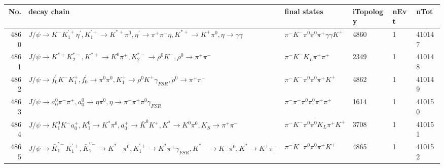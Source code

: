 \begin{table}[htbp] 
\begin{center}
\begin{small}
\begin{tabular}{rlllll}\hline\hline
 No. & decay chain & final states &  iTopology & nEvt & nTot \\\hline
4860&$J/\psi       \rightarrow K^{-}          K_1^{'+}      \eta^{\prime} , K_1^{'+}       \rightarrow K^{*+}         \pi^{0}        , \eta^{\prime}  \rightarrow \pi^{+}        \pi^{-}        \eta          , K^{*+}          \rightarrow K^{+}          \pi^{0}        , \eta           \rightarrow \gamma       \gamma       $&$\pi^{-}        K^{-}          \pi^{0}        \pi^{0}        \pi^{+}        \gamma       \gamma       K^{+}          $& 4860&    1&410147\\
4861&$J/\psi       \rightarrow K^{*+}         K_2^{*-}       , K^{*+}          \rightarrow K^{0}          \pi^{+}        , K_2^{*-}        \rightarrow \rho^{0}      K^{-}          , \rho^{0}       \rightarrow \pi^{+}        \pi^{-}        $&$\pi^{-}        K^{-}          K_{L}          \pi^{+}        \pi^{+}        $& 2349&    1&410148\\
4862&$J/\psi       \rightarrow f^{'}_{0}     K^{-}          K_1^{+}        , f^{'}_{0}      \rightarrow \pi^{0}        \pi^{0}        , K_1^{+}         \rightarrow \rho^{0}      K^{+}          \gamma_{FSR} , \rho^{0}       \rightarrow \pi^{+}        \pi^{-}        $&$\pi^{-}        K^{-}          \pi^{0}        \pi^{0}        \pi^{+}        K^{+}          $& 4862&    1&410149\\
4863&$J/\psi       \rightarrow a_{0}^{0}      \pi^{-}        \pi^{+}        , a_{0}^{0}       \rightarrow \eta          \pi^{0}        , \eta           \rightarrow \pi^{-}        \pi^{+}        \pi^{0}        \gamma_{FSR} $&$\pi^{-}        \pi^{-}        \pi^{0}        \pi^{0}        \pi^{+}        \pi^{+}        $& 1614&    1&410150\\
4864&$J/\psi       \rightarrow K_1^{0}        K^{-}          a_{0}^{+}      , K_1^{0}         \rightarrow K^{*}          \pi^{0}        , a_{0}^{+}       \rightarrow \bar{K}^{0}   K^{+}          , K^{*}           \rightarrow K^{0}          \pi^{0}        , K_{S}           \rightarrow \pi^{+}        \pi^{-}        $&$\pi^{-}        K^{-}          \pi^{0}        \pi^{0}        K_{L}          \pi^{+}        K^{+}          $& 3708&    1&410151\\
4865&$J/\psi       \rightarrow \bar{K}_1^{'-}K_1^{'+}      , \bar{K}_1^{'-} \rightarrow K^{*-}         \pi^{0}        , K_1^{'+}       \rightarrow K^{*}          \pi^{+}        \gamma_{FSR} , K^{*-}          \rightarrow K^{-}          \pi^{0}        , K^{*}           \rightarrow K^{+}          \pi^{-}        $&$\pi^{-}        K^{-}          \pi^{0}        \pi^{0}        \pi^{+}        K^{+}          $& 4865&    1&410152\\

\end{tabular}
\end{small}
\end{center}
\end{table}
